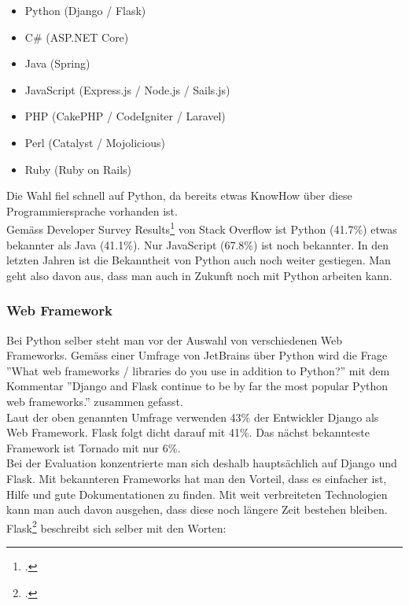 
\begin{itemize}
	\item Python (Django / Flask)
	\item C\# (ASP.NET Core)
	\item Java (Spring)
	\item JavaScript (Express.js / Node.js / Sails.js)
	\item PHP (CakePHP / CodeIgniter / Laravel)
	\item Perl (Catalyst / Mojolicious)
	\item Ruby (Ruby on Rails)
\end{itemize}


Die Wahl fiel schnell auf Python, da bereits etwas KnowHow über diese Programmiersprache vorhanden ist. \\
Gemäss Developer Survey Results\footcite{developer_survey_results} von Stack Overflow ist Python (41.7\%) etwas bekannter als Java (41.1\%). Nur JavaScript (67.8\%) ist noch bekannter. In den letzten Jahren ist die Bekanntheit von Python auch noch weiter gestiegen. Man geht also davon aus, dass man auch in Zukunft noch mit Python arbeiten kann.


\subsubsection*{Web Framework}
Bei Python selber steht man vor der Auswahl von verschiedenen Web Frameworks. Gemäss einer Umfrage von JetBrains über Python wird die Frage ''What web frameworks / libraries do you use in addition to Python?'' mit dem Kommentar ''Django and Flask continue to be by far the most popular Python web frameworks.'' zusammen gefasst. \\
Laut der oben genannten Umfrage verwenden 43\% der Entwickler  Django als Web Framework. Flask folgt dicht darauf mit 41\%. Das nächst bekannteste Framework ist Tornado mit nur 6\%. \\
Bei der Evaluation konzentrierte man sich deshalb hauptsächlich auf Django und Flask. Mit bekannteren Frameworks hat man den Vorteil, dass es einfacher ist, Hilfe und gute Dokumentationen zu finden. Mit weit verbreiteten Technologien kann man auch davon ausgehen, dass diese noch längere Zeit bestehen bleiben.  \\ 

Flask\footcite{flask:foreword} beschreibt sich selber mit den Worten:

